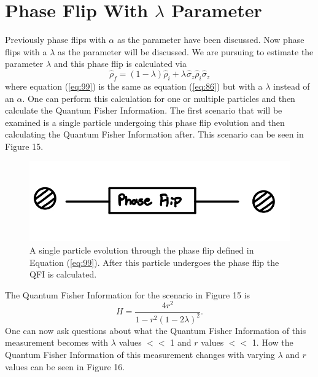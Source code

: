 \documentclass[twocolumn]{article}
\begin{document}
\section*{Phase Flip With $\lambda$ Parameter}
Previously phase flips with $\alpha$ as the parameter have been discussed. Now phase flips with a $\lambda$ as the parameter will be discussed. We are pursuing to estimate the parameter $\lambda$ and this phase flip is calculated via
\begin{equation}\label{eq:99}
\hat{\rho}_f=(1-\lambda)\hat{\rho}_i+\lambda\hspace{1pt}\hat{\sigma}_z\hat{\rho}_i\hat{\sigma}_z
\end{equation}
where equation (\ref{eq:99}) is the same as equation (\ref{eq:86}) but with a $\lambda$ instead of an $\alpha$. One can perform this calculation for one or multiple particles and then calculate the Quantum Fisher Information. The first scenario that will be examined is a single particle undergoing this phase flip evolution and then calculating the Quantum Fisher Information after. This scenario can be seen in Figure 15.
\begin{figure}[h]
\begin{center}
\includegraphics[width=0.65\linewidth]{Single-Particle-Phase-Flip-Evolution-Schematic.jpg}
\caption{A single particle evolution through the phase flip defined in Equation (\ref{eq:99}). After this particle undergoes the phase flip the QFI is calculated.}
\end{center}
\end{figure}
\newline
The Quantum Fisher Information for the scenario in Figure 15 is
\begin{equation}\label{eq:100}
H=\frac{4r^2}{1-r^2(1-2\lambda)^2}.
\end{equation}
One can now ask questions about what the Quantum Fisher Information of this measurement becomes with $\lambda$ values $<<$ 1 and $r$ values $<<$ 1. How the Quantum Fisher Information of this measurement changes with varying $\lambda$ and $r$ values can be seen in Figure 16.
\end{document}
